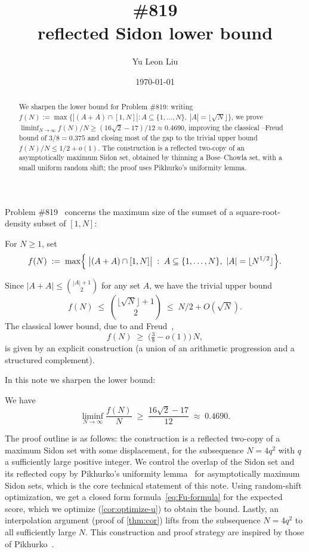 \documentclass[11pt]{amsart}
\title[\Erdos \#819: reflected Sidon lower bound]{\Erdos \#819 \\
{\tiny reflected Sidon lower bound}}
\author{Yu Leon Liu}
\date{\today}
\begin{document}
\begin{abstract}
We sharpen the lower bound for \Erdos{} Problem \#819: writing $f(N) := \max\{|(A+A)\cap[1,N]| : A\subseteq\{1,\ldots,N\},\ |A|=\lfloor\sqrt N\rfloor\}$, we prove $\liminf_{N\to\infty} f(N)/N \geq (16\sqrt 2 - 17)/12 \approx 0.4690$, improving the classical \Erdos--Freud bound of $3/8 = 0.375$ and closing most of the gap to the trivial upper bound $f(N)/N \le 1/2 + o(1)$. The construction is a reflected two-copy of an asymptotically maximum Sidon set, obtained by thinning a Bose--Chowla set, with a small uniform random shift; the proof uses Pikhurko's uniformity lemma.
\end{abstract}

\maketitle

\Erdos Problem \#819~\cite{bloom819} concerns the maximum size of the
sumset of a square-root-density subset of $[1,N]$:
\begin{definition}\label{def:f}
For $N\geq 1$, set
\[
f(N) \;:=\; \max\Bigl\{\;\bigl|(A+A)\cap[1,N]\bigr| \;:\; A\subseteq\{1,\ldots,N\},\ |A|=\lfloor N^{1/2}\rfloor\Bigr\}.
\]
\end{definition}
Since $|A+A| \le \binom{|A|+1}{2}$ for any set $A$, we have the trivial upper bound
\[
f(N)\;\leq\;\binom{\lfloor\sqrt N\rfloor+1}{2}\;\leq\;N/2+O(\sqrt N).
\]
The classical lower bound, due to \Erdos{} and Freud~\cite{ErdosFreud1991},
\begin{equation}\label{eq:ef}
f(N)\;\geq\;\bigl(\tfrac{3}{8}-o(1)\bigr)\,N,
\end{equation}
is given by an explicit construction (a union of an arithmetic progression and a structured complement).

In this note we sharpen the lower bound:
\begin{theorem}\label{thm:cor}
We have
\[
\liminf_{N\to\infty}\frac{f(N)}{N}
\;\geq\;
\frac{16\sqrt 2-17}{12}\;\approx\;0.4690.
\]
\end{theorem}

The proof outline is as follows: the construction is a reflected two-copy of a maximum Sidon set with some displacement, for the subsequence $N = 4q^2$ with $q$ a sufficiently large positive integer. We control the overlap of the Sidon set and its reflected copy by Pikhurko's uniformity lemma~\cite[Lemma~10]{Pikhurko2006} for asymptotically maximum Sidon sets, which is the core technical statement of this note. Using random-shift optimization, we get a closed form formula~\eqref{eq:Fu-formula} for the expected score, which we optimize (\cref{cor:optimize-u}) to obtain the bound. Lastly, an interpolation argument (proof of \cref{thm:cor}) lifts from the subsequence $N = 4q^2$ to all sufficiently large $N$. This construction and proof strategy are inspired by those of Pikhurko~\cite[Lemma~12]{Pikhurko2006}.
\end{document}
